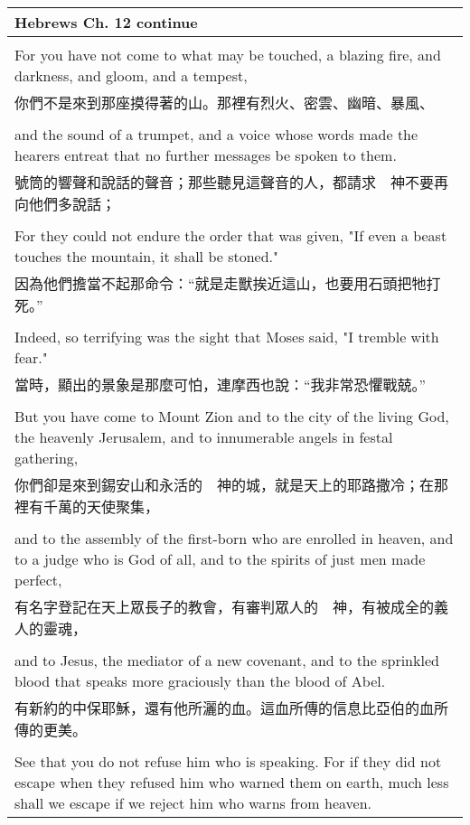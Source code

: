 \documentclass{book}
\begin{document}
\begin{tabularx}{\textwidth}{p{}}
\hline
Hebrews Ch. 12 continue \\
\hline \\
For you have not come to what may be touched, a blazing fire, and darkness, and gloom, and a tempest, \\
你們不是來到那座摸得著的山。那裡有烈火、密雲、幽暗、暴風、 \\ \\
and the sound of a trumpet, and a voice whose words made the hearers entreat that no further messages be spoken to them. \\
號筒的響聲和說話的聲音；那些聽見這聲音的人，都請求　神不要再向他們多說話； \\ \\
For they could not endure the order that was given, "If even a beast touches the mountain, it shall be stoned." \\
因為他們擔當不起那命令：“就是走獸挨近這山，也要用石頭把牠打死。” \\ \\
Indeed, so terrifying was the sight that Moses said, "I tremble with fear." \\
當時，顯出的景象是那麼可怕，連摩西也說：“我非常恐懼戰兢。” \\ \\
But you have come to Mount Zion and to the city of the living God, the heavenly Jerusalem, and to innumerable angels in festal gathering, \\
你們卻是來到錫安山和永活的　神的城，就是天上的耶路撒冷；在那裡有千萬的天使聚集， \\ \\
and to the assembly of the first-born who are enrolled in heaven, and to a judge who is God of all, and to the spirits of just men made perfect, \\
有名字登記在天上眾長子的教會，有審判眾人的　神，有被成全的義人的靈魂， \\ \\
and to Jesus, the mediator of a new covenant, and to the sprinkled blood that speaks more graciously than the blood of Abel. \\
有新約的中保耶穌，還有他所灑的血。這血所傳的信息比亞伯的血所傳的更美。 \\ \\
See that you do not refuse him who is speaking. For if they did not escape when they refused him who warned them on earth, much less shall we escape if we reject him who warns from heaven. \\

\end{tabularx}
\end{document}
